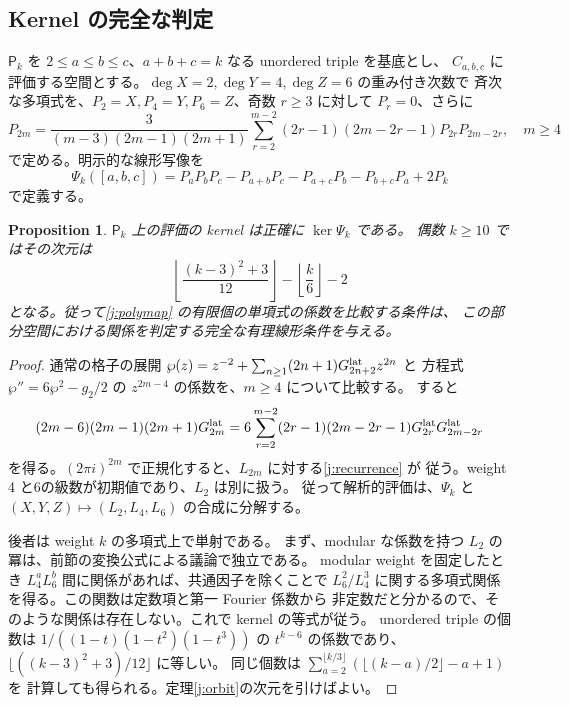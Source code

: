 \documentclass[12pt]{amsart}
\newtheorem{prop}[thm]{Proposition}
\theoremstyle{definition}
\theoremstyle{remark}
\numberwithin{equation}{section}
\numberwithin{equation}{section}
\begin{document}
\subsection{Kernel の完全な判定}\label{j:kernel}
$\mathsf P_k$ を $2\le a\le b\le c$、$a+b+c=k$ なる unordered triple を基底とし、
$C_{a,b,c}$ に評価する空間とする。$\deg X=2,\deg Y=4,\deg Z=6$ の重み付き次数で
斉次な多項式を、$P_2=X,P_4=Y,P_6=Z$、奇数 $r\ge3$ に対して $P_r=0$、さらに
\begin{equation}\label{j:recurrence}
 P_{2m}=\frac{3}{(m-3)(2m-1)(2m+1)}
 \sum_{r=2}^{m-2}(2r-1)(2m-2r-1)P_{2r}P_{2m-2r},\quad m\ge4
\end{equation}
で定める。明示的な線形写像を
\begin{equation}\label{j:polymap}
 \Psi_k([a,b,c])=P_aP_bP_c-P_{a+b}P_c-P_{a+c}P_b-P_{b+c}P_a+2P_k
\end{equation}
で定義する。
\begin{prop}\label{j:kernelprop}
$\mathsf P_k$ 上の評価の kernel は正確に $\ker\Psi_k$ である。
偶数 $k\ge10$ ではその次元は
\[
 \left\lfloor\frac{(k-3)^2+3}{12}\right\rfloor
       -\left\lfloor\frac{k}{6}\right\rfloor-2
\]
となる。従って\eqref{j:polymap} の有限個の単項式の係数を比較する条件は、
この部分空間における関係を判定する完全な有理線形条件を与える。
\end{prop}
\begin{proof}
通常の格子の展開
$\wp(z)=z^{-2}+\sum_{n\ge1}(2n+1)G^{\rm lat}_{2n+2}z^{2n}$ と
方程式 $\wp''=6\wp^2-g_2/2$ の $z^{2m-4}$ の係数を、$m\ge4$ について比較する。
すると
\[
 (2m-6)(2m-1)(2m+1)G^{\rm lat}_{2m}
 =6\sum_{r=2}^{m-2}(2r-1)(2m-2r-1)
           G^{\rm lat}_{2r}G^{\rm lat}_{2m-2r}
\]
を得る。$(2\pi i)^{2m}$ で正規化すると、$L_{2m}$ に対する\eqref{j:recurrence} が
従う。weight 4 と6の級数が初期値であり、$L_2$ は別に扱う。
従って解析的評価は、$\Psi_k$ と $(X,Y,Z)\mapsto(L_2,L_4,L_6)$ の合成に分解する。

後者は weight $k$ の多項式上で単射である。
まず、modular な係数を持つ $L_2$ の冪は、前節の変換公式による議論で独立である。
modular weight を固定したとき $L_4^aL_6^b$ 間に関係があれば、共通因子を除くことで
$L_6^2/L_4^3$ に関する多項式関係を得る。この関数は定数項と第一 Fourier 係数から
非定数だと分かるので、そのような関係は存在しない。これで kernel の等式が従う。
unordered triple の個数は $1/((1-t)(1-t^2)(1-t^3))$ の $t^{k-6}$ の係数であり、
$\lfloor((k-3)^2+3)/12\rfloor$ に等しい。
同じ個数は $\sum_{a=2}^{\lfloor k/3\rfloor}(\lfloor(k-a)/2\rfloor-a+1)$ を
計算しても得られる。定理\ref{j:orbit}の次元を引けばよい。
\end{proof}
\end{document}
